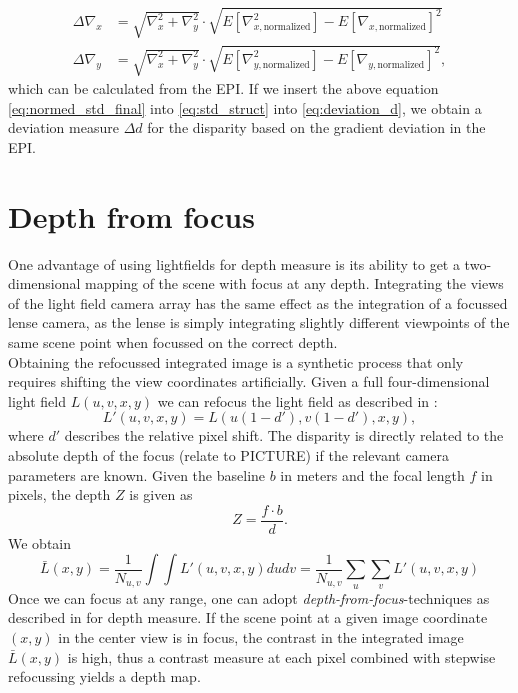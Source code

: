 \documentclass  [
  paper    = a4,
  BCOR     = 10mm,
  twoside,
  fontsize = 12pt,
  fleqn,
  toc      = bibnumbered,
  toc      = listofnumbered,
  numbers  = noendperiod,
  headings = normal,
  listof   = leveldown,
  version  = 3.03
]                                       {scrreprt}
\begin{document}
 \begin{align}\label{eq:normed_std_final}
 \Delta\nabla_{x} &=  \sqrt{\nabla_x^2 + \nabla_y^2} \cdot \sqrt{E[\nabla_{x, \text{normalized}}^2] - E[\nabla_{x, \text{normalized}}]^2}\\
 \Delta\nabla_{y} &= \sqrt{\nabla_x^2 + \nabla_y^2} \cdot \sqrt{E[\nabla_{y, \text{normalized}}^2] - E[\nabla_{y, \text{normalized}}]^2},
 \end{align}
 which can be calculated from the EPI.
 If we insert the above equation \ref{eq:normed_std_final} into \ref{eq:std_struct} into \ref{eq:deviation_d}, we obtain a deviation measure $\Delta d$ for the disparity based on the gradient deviation in the EPI.
 
\section{Depth from focus}
\label{sec:theo depth}
One advantage of using lightfields for depth measure is its ability to get a two-dimensional mapping of the scene with focus at any depth. Integrating the views of the light field camera array has the same effect as the integration of a focussed lense camera, as the lense is simply integrating slightly different viewpoints of the same scene point when focussed on the correct depth. \\
 Obtaining the refocussed integrated image is a synthetic process that only requires shifting the view coordinates artificially. Given a full four-dimensional light field $L(u, v, x, y)$ we can refocus the light field as described in \cite{ng2005light}:
 \begin{equation}\label{eq:refocus}
L'(u, v, x, y) = L(u(1-d'), v(1-d'), x, y),
\end{equation}
where $d'$ describes the relative pixel shift. The disparity is directly related to the absolute depth of the focus (relate to PICTURE) if the relevant camera parameters are  known. Given the baseline $b$ in meters and the focal length $f$ in pixels, the depth $Z$ is given as \begin{equation}\label{key}
Z = \frac{f\cdot b}{d}.
\end{equation} 
We obtain
\begin{equation}\label{key}
\bar{L}(x,y) = \frac{1}{N_{u,v}}\int\int L'(u, v, x, y) du  dv =\frac{1}{N_{u,v}}\sum_{u}\sum_{v}  L'(u, v, x, y)
\end{equation}
Once we can focus at any range, one can adopt \textit{depth-from-focus}-techniques as described in \cite{watanabe1998rational} for depth measure. If the scene point at a given image coordinate $(x, y)$ in the center view is in focus, the contrast in the integrated image $\bar{L}(x,y)$ is high, thus a contrast measure at each pixel combined with stepwise refocussing yields a depth map. \\
\end{document}
